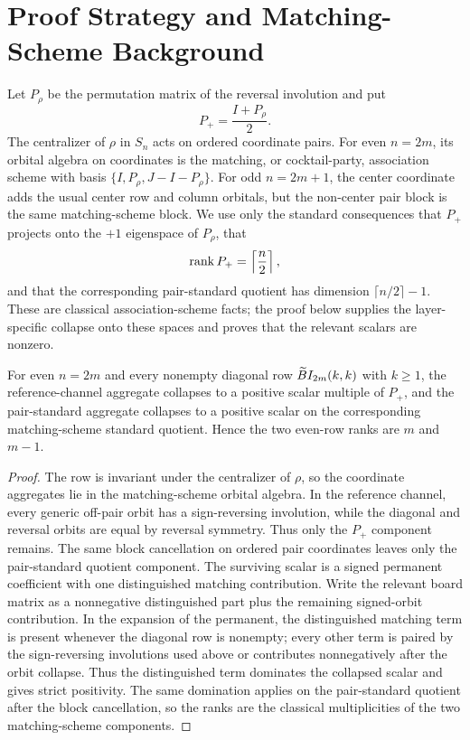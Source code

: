 \section{Proof Strategy and Matching-Scheme Background}\label{sec:background}

Let $P_\rho$ be the permutation matrix of the reversal involution and put
\[
  P_+=\frac{I+P_\rho}{2}.
\]
The centralizer of $\rho$ in $S_n$ acts on ordered coordinate pairs.  For even $n=2m$, its orbital algebra on
coordinates is the matching, or cocktail-party, association scheme with basis
$\{I,P_\rho,J-I-P_\rho\}$.  For odd $n=2m+1$, the center coordinate adds the usual center row and column orbitals,
but the non-center pair block is the same matching-scheme block.  We use only the standard consequences that
$P_+$ projects onto the $+1$ eigenspace of $P_\rho$, that
\[
  \operatorname{rank} P_+=\left\lceil\frac n2\right\rceil,
\]
and that the corresponding pair-standard quotient has dimension $\lceil n/2\rceil-1$.
These are classical association-scheme facts; the proof below supplies the layer-specific collapse onto these
spaces and proves that the relevant scalars are nonzero.
\begin{lemma}\label{lem:even}
For even $n=2m$ and every nonempty diagonal row $\widetilde{B}I_{2m}(k,k)$ with $k\ge1$, the reference-channel aggregate
collapses to a positive scalar multiple of $P_+$, and the pair-standard aggregate collapses to a positive scalar on the
corresponding matching-scheme standard quotient.  Hence the two even-row ranks are $m$ and $m-1$.
\end{lemma}

\begin{proof}
The row is invariant under the centralizer of $\rho$, so the coordinate aggregates lie in the matching-scheme orbital
algebra.  In the reference channel, every generic off-pair orbit has a sign-reversing involution, while the diagonal
and reversal orbits are equal by reversal symmetry.  Thus only the $P_+$ component remains.  The same block cancellation
on ordered pair coordinates leaves only the pair-standard quotient component.  The surviving scalar is a signed permanent coefficient with one distinguished matching contribution.  Write the relevant board matrix as a nonnegative distinguished part plus the remaining signed-orbit contribution.  In the expansion of the permanent, the distinguished matching term is present whenever the diagonal row is nonempty; every other term is paired by the sign-reversing involutions used above or contributes nonnegatively after the orbit collapse.  Thus the distinguished term dominates the collapsed scalar and gives strict positivity.  The same domination applies on the pair-standard quotient after the block cancellation, so the ranks are the classical multiplicities of the two matching-scheme components.
\end{proof}

